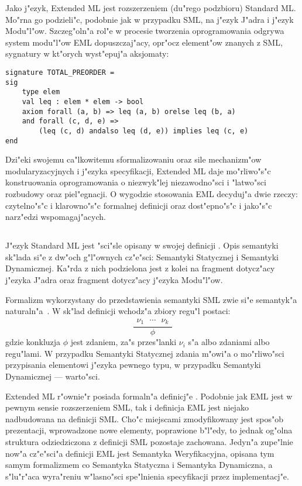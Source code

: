 Jako j"ezyk, Extended ML jest rozszerzeniem (du"rego podzbioru) Standard ML.
Mo"rna go podzieli"c, podobnie jak w przypadku SML, na j"ezyk J"adra i j"ezyk Modu"l"ow.
Szczeg"oln"a rol"e w procesie tworzenia oprogramowania odgrywa system modu"l"ow EML
dopuszczaj"acy, opr"ocz element"ow znanych z SML, sygnatury w kt"orych wyst"epuj"a aksjomaty:

\begin{verbatim}
signature TOTAL_PREORDER =
sig
    type elem 
    val leq : elem * elem -> bool 
    axiom forall (a, b) => leq (a, b) orelse leq (b, a)
    and forall (c, d, e) => 
        (leq (c, d) andalso leq (d, e)) implies leq (c, e)
end
\end{verbatim}

Dzi"eki swojemu ca"lkowitemu sformalizowaniu oraz sile mechanizm"ow modularyzacyjnych
i j"ezyka specyfikacji, Extended ML daje mo"rliwo"s"c konstruowania oprogramowania
o niezwyk"lej niezawodno"sci i "latwo"sci rozbudowy oraz piel"egnacji.
O wygodzie stosowania EML decyduj"a dwie rzeczy: czytelno"s"c i klarowno"s"c
formalnej definicji oraz dost"epno"s"c i jako"s"c narz"edzi wspomagaj"acych.

\subsection{\secformal}
\label{sec:formal}

J"ezyk Standard ML jest "sci"sle opisany w swojej definicji \cite{MTH90}.
Opis semantyki sk"lada si"e z dw"och g"l"ownych cz"e"sci: Semantyki Statycznej i Semantyki Dynamicznej.
Ka"rda z nich podzielona jest z kolei na fragment dotycz"acy j"ezyka J"adra
oraz fragment dotycz"acy j"ezyka Modu"l"ow.

Formalizm wykorzystany do przedstawienia semantyki SML zwie si"e semantyk"a naturaln"a~\cite{Han93}.
W sk"lad definicji wchodz"a zbiory regu"l postaci:
$$
\frac{\begin{array}{c}
\nu_1\ \ \ \cdots\ \ \ \nu_k
\end{array}}
     {\phi}
$$ %
gdzie konkluzja $\phi$ jest zdaniem, za"s przes"lanki $\nu_i$ s"a albo zdaniami albo regu"lami.
W przypadku Semantyki Statycznej zdania m"owi"a o mo"rliwo"sci przypisania elementowi j"ezyka
pewnego typu, w przypadku Semantyki Dynamicznej --- warto"sci.

Extended ML r"ownie"r posiada formaln"a definicj"e \cite{bib:KST94}.
Podobnie jak EML jest w pewnym sensie rozszerzeniem SML,
tak i definicja EML jest niejako nadbudowana na definicji SML. 
Cho"c miejscami zmodyfikowany jest spos"ob prezentacji,
wprowadzone nowe elementy, poprawione b"l"edy,
to jednak og"olna struktura odziedziczona z definicji SML pozostaje zachowana.
Jedyn"a zupe"lnie now"a cz"e"sci"a definicji EML jest 
Semantyka Weryfikacyjna, opisana tym samym formalizmem co Semantyka Statyczna i Semantyka Dynamiczna, 
a s"lu"r"aca wyra"reniu w"lasno"sci spe"lnienia specyfikacji przez implementacj"e.

